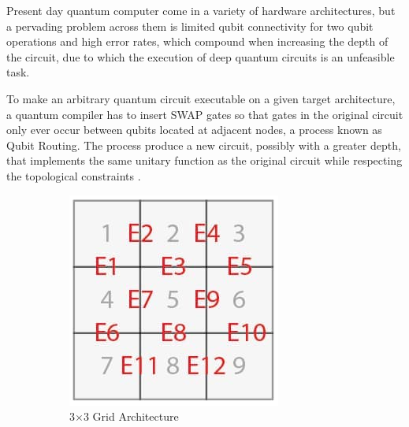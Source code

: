 \documentclass[%
 reprint,
 amsmath,amssymb,
 aps,
]{revtex4-2}
\begin{document}
Present day quantum computer come in a variety of hardware architectures, but a pervading problem across them is limited qubit connectivity for two qubit operations and high error rates, which compound when increasing the depth of the circuit, due to which the execution of deep quantum circuits is an unfeasible task.

To make an arbitrary quantum circuit executable on a given target architecture, a quantum compiler has to insert SWAP gates so that gates in the original circuit only ever occur between qubits located at adjacent nodes, a process known as Qubit Routing. The process produce a new circuit, possibly with a greater depth, that implements the same unitary function as the original circuit while respecting
the topological constraints \citep{qroute_dqn2}.

\begin{figure}
    \centering
    \begin{subfigure}[b]{0.38\linewidth}
        \includegraphics[width=\linewidth]{images/device-grid.jpg}
        \caption{3$\times$3 Grid Architecture}
    \end{subfigure}
    \begin{subfigure}[b]{0.56\linewidth}

\end{subfigure}
\end{figure}
\end{document}

